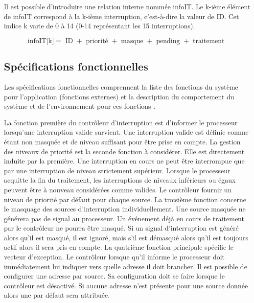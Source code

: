 Il est possible d'introduire une relation interne nommée infoIT. Le k-ième élément de infoIT correspond à la k-ième interruption, c'est-à-dire la valeur de ID. Cet indice k varie de 0 à 14 (0-14 représentant les 15 interruptions).

\begin{equation*}
	\mbox{infoIT[k]} = \mbox{ ID } + \mbox{ priorité } + \mbox{ masque } + \mbox{ pending } + \mbox{ traitement }
\end{equation*}

\newpage

\subsection{Spécifications fonctionnelles}
Les spécifications fonctionnelles comprennent la liste des fonctions du système
pour l'application (fonctions externes) et la description du comportement du système et
de l'environnement pour ces fonctions \cite{Calvez_2}.

\gap

La fonction première du contrôleur d'interruption est d'informer le processeur lorsqu'une interruption valide survient.
Une interruption valide est définie comme étant non masquée et de niveau suffisant pour être prise en compte.
La gestion des niveaux de priorité est la seconde fonction à considérer.
Elle est directement induite par la première.
Une interruption en cours ne peut être interrompue que par une interruption de niveau strictement supérieur.
Lorsque le processeur acquitte la fin du traitement, les interruptions de niveaux inférieurs ou égaux peuvent être à nouveau considérées comme valides.
Le contrôleur fournir un niveau de priorité par défaut pour chaque source.
La troisième fonction concerne le masquage des sources d'interruption individuellement.
Une source masquée ne générera pas de signal au processeur.
Un événement déjà en cours de traitement par le contrôleur ne pourra être masqué. %
Si un signal d'interruption est généré alors qu'il est masqué, il est ignoré, mais s'il est démasqué alors qu'il est toujours actif alors il sera pris en compte. %
La quatrième fonction principale spécifie le vecteur d'exception.
Le contrôleur lorsque qu'il informe le processeur doit immédiatement lui indiquer vers quelle adresse il doit brancher.
Il est possible de configurer une adresse par source.
Sa configuration doit se faire lorsque le contrôleur est désactivé.
Si aucune adresse n'est présente pour une source donnée alors une par défaut sera attribuée.

